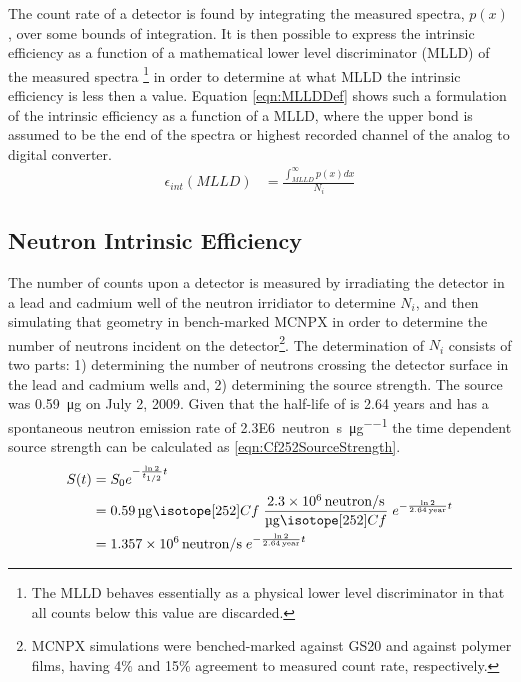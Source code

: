 The count rate of a detector is found by integrating the measured spectra, $p(x)$, over some bounds of integration.
It is then possible to express the intrinsic efficiency as a function of a mathematical lower level discriminator (MLLD) of the measured spectra \footnote{The MLLD behaves essentially as a physical lower level discriminator in that all counts below this value are discarded.} in order to determine at what MLLD the intrinsic efficiency is less then a value.
Equation \eqref{eqn:MLLDDef} shows such a formulation of the intrinsic efficiency as a function of a MLLD, where the upper bond is assumed to be the end of the spectra or highest recorded channel of the analog to digital converter.
\begin{align}
	\label{eqn:MLLDDef}
	\epsilon_{int}(MLLD) &= \frac{\int_{MLLD}^\infty p(x)dx}{N_i}
\end{align}

\subsection{Neutron Intrinsic Efficiency}
The number of counts upon a detector is measured by irradiating the detector in a lead and cadmium well of the neutron irridiator to determine $N_i$, and then simulating that geometry in bench-marked MCNPX in order to determine the number of neutrons incident on the detector\footnote{MCNPX simulations were benched-marked against GS20 and against polymer films, having 4\% and 15\% agreement to measured count rate, respectively.}.
The determination of $N_i$ consists of two parts: 1) determining the number of neutrons crossing the detector surface in the lead and cadmium wells and, 2) determining the source strength.
The  source was \SI{0.59}{\ug} on July 2, 2009.
Given that the half-life of  is 2.64 years and  has a spontaneous neutron emission rate of \SI{2.3E6}{neutron\per\second\per\micro\gram} the time dependent source strength can be calculated as \eqref{eqn:Cf252SourceStrength}.
\begin{align}
  \label{eqn:Cf252SourceStrength}
  S(t) &= S_0 e^{-\frac{\ln{2}}{t_{1/2}} t} \\ \notag 
    &= \SI{0.59}{\ug} \iso[252]{Cf} \;\frac{\SI{2.3E6}{neutron\per\second}}{\si{\ug} \iso[252]{Cf}}\; e^{-\frac{ \ln{2}}{\SI{2.64}{year}}t}  \\ \notag
    &= \SI{1.357E6}{neutron\per\second}\; e^{-\frac{ \ln{2}}{\SI{2.64}{year}}t} 
\end{align}

